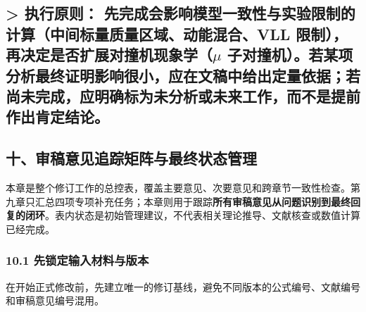 \documentclass[
  chinese,
  UTF8]{ctexart}
\begin{document}
\subsection{\texorpdfstring{\textgreater{} \textbf{执行原则：}
先完成会影响模型一致性与实验限制的计算（中间标量质量区域、动能混合、VLL
限制），再决定是否扩展对撞机现象学（\ensuremath{\mu}
子对撞机）。若某项分析最终证明影响很小，应在文稿中给出定量依据；若尚未完成，应明确标为未分析或未来工作，而不是提前作出肯定结论。}{\textgreater{} 执行原则： 先完成会影响模型一致性与实验限制的计算（中间标量质量区域、动能混合、VLL 限制），再决定是否扩展对撞机现象学（ 子对撞机）。若某项分析最终证明影响很小，应在文稿中给出定量依据；若尚未完成，应明确标为未分析或未来工作，而不是提前作出肯定结论。}}\label{ux6267ux884cux539fux5219-ux5148ux5b8cux6210ux4f1aux5f71ux54cdux6a21ux578bux4e00ux81f4ux6027ux4e0eux5b9eux9a8cux9650ux5236ux7684ux8ba1ux7b97ux4e2dux95f4ux6807ux91cfux8d28ux91cfux533aux57dfux52a8ux80fdux6df7ux5408vll-ux9650ux5236ux518dux51b3ux5b9aux662fux5426ux6269ux5c55ux5bf9ux649eux673aux73b0ux8c61ux5b66-ux5b50ux5bf9ux649eux673aux82e5ux67d0ux9879ux5206ux6790ux6700ux7ec8ux8bc1ux660eux5f71ux54cdux5f88ux5c0fux5e94ux5728ux6587ux7a3fux4e2dux7ed9ux51faux5b9aux91cfux4f9dux636eux82e5ux5c1aux672aux5b8cux6210ux5e94ux660eux786eux6807ux4e3aux672aux5206ux6790ux6216ux672aux6765ux5de5ux4f5cux800cux4e0dux662fux63d0ux524dux4f5cux51faux80afux5b9aux7ed3ux8bba}

\subsection{十、审稿意见追踪矩阵与最终状态管理}\label{ux5341ux5ba1ux7a3fux610fux89c1ux8ffdux8e2aux77e9ux9635ux4e0eux6700ux7ec8ux72b6ux6001ux7ba1ux7406}

本章是整个修订工作的总控表，覆盖主要意见、次要意见和跨章节一致性检查。第九章只汇总四项专项补充任务；本章则用于跟踪\textbf{所有审稿意见从问题识别到最终回复的闭环}。表内状态是初始管理建议，不代表相关理论推导、文献核查或数值计算已经完成。

\subsubsection{10.1
先锁定输入材料与版本}\label{ux5148ux9501ux5b9aux8f93ux5165ux6750ux6599ux4e0eux7248ux672c}

在开始正式修改前，先建立唯一的修订基线，避免不同版本的公式编号、文献编号和审稿意见编号混用。
\end{document}
